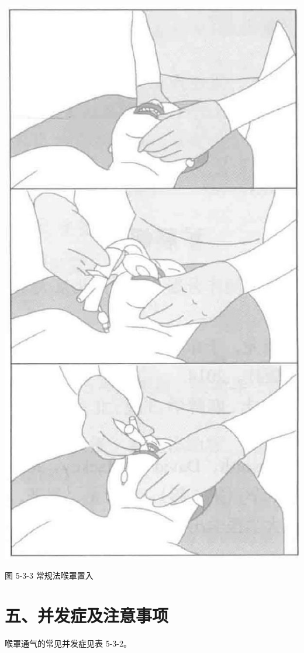 \documentclass[10pt]{article}
\begin{document}
\begin{center}
\includegraphics[max width=\textwidth]{2024_07_05_645bb794a4d4f32ee0c8g-295}
\end{center}

图 5-3-3 常规法喉罩置入

\section*{五、并发症及注意事项}
喉罩通气的常见并发症见表 5-3-2。
\end{document}
